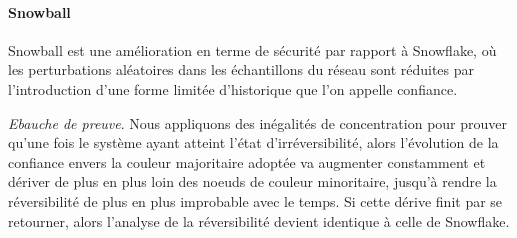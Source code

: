 \documentclass[letterpaper,twocolumn,10pt]{article}
\theoremstyle{definition}
\begin{document}


\paragraph{Snowball}

Snowball est une amélioration en terme de sécurité par rapport à Snowflake, où les perturbations aléatoires dans les
échantillons du réseau sont réduites par l'introduction d'une forme limitée d'historique que l'on appelle confiance.

\noindent \emph{Ebauche de preuve}. Nous appliquons des inégalités de concentration pour prouver qu'une fois le système
ayant atteint l'état d'irréversibilité, alors l'évolution de la confiance envers la couleur majoritaire adoptée va
augmenter constamment et dériver de plus en plus loin des noeuds de couleur minoritaire, jusqu'à rendre la réversibilité
de plus en plus improbable avec le temps. Si cette dérive finit par se retourner, alors l'analyse de la réversibilité
devient identique à celle de Snowflake.
\end{document}
